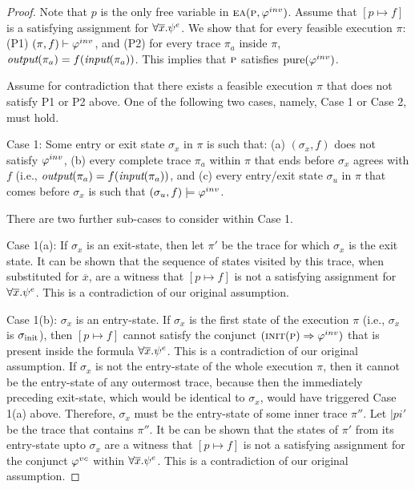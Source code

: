 \begin{proof}

Note that $p$ is the only free variable in $\textsc{ea}(\textsc{p},\varphi^{inv})$. Assume that $[p \mapsto f]$ is a
satisfying assignment
for  $ \forall \overline{x}. \psi^e$.
We show that for every feasible execution $\pi$: (P1) $(\pi, f)
\vdash \varphi^{inv}$, and (P2) for every trace $\pi_a$ inside $\pi$,
$\textit{output}(\pi_a) = f(\textit{input}(\pi_a))$. This implies that
$\textsc{p}$ satisfies $\mathrm{pure}(\varphi^{inv})$.

Assume for contradiction that there exists a feasible execution $\pi$ that does
not satisfy P1 or P2 above. One of the following two cases, namely, Case 1
or Case 2, must hold. 

Case 1: Some entry or exit state $\sigma_x$ in $\pi$ is such that: (a)
$(\sigma_x, f)$ does not satisfy $\varphi^{inv}$,  (b) every complete trace
$\pi_a$ within $\pi$ that ends before $\sigma_x$ agrees with $f$ (i.e.,
$\textit{output}(\pi_a) = f(\textit{input}(\pi_a))$, and (c) every entry/exit state
$\sigma_u$ in $\pi$ that comes before $\sigma_x$ is such that $(\sigma_u,
f) \models \varphi^{inv}$.

There are two further sub-cases to consider within Case 1.

Case 1(a): If $\sigma_x$ is an exit-state, then let $\pi'$ be the trace for
which $\sigma_x$ is the exit state. It can be shown that the sequence of
states visited by this trace, when substituted for $\overline{x}$, are a
witness that $[p \mapsto f]$ is not a satisfying assignment for  $\forall
\overline{x}. \psi^e$. This is a contradiction of our original
assumption. 

Case 1(b): $\sigma_x$ is an entry-state. If $\sigma_x$ is the first
state of the execution $\pi$ (i.e., $\sigma_x$ is $\sigma_{\text{init}}$), then $[p
  \mapsto f]$ cannot satisfy the conjunct $(\textsc{init}(\textsc{p}) \Rightarrow
\varphi^{inv})$ that is present inside the formula $\forall
\overline{x}. \psi^e$. This is a contradiction of our original
assumption. If $\sigma_x$ is not the entry-state of the whole execution
$\pi$, then it cannot be the entry-state of any outermost trace, because
then the immediately preceding exit-state, which would be identical to
$\sigma_x$, would have triggered Case 1(a) above. Therefore, $\sigma_x$
must be the entry-state of some inner trace $\pi''$. Let $|pi'$ be the trace that
contains $\pi''$. It be can be shown that the states of $\pi'$ from its entry-state
upto $\sigma_x$ are a witness that $[p \mapsto f]$ is not a satisfying
assignment for the conjunct $\varphi^{vc}$ within $\forall
\overline{x}. \psi^e$. This is a contradiction of our original
assumption.


\end{proof}
